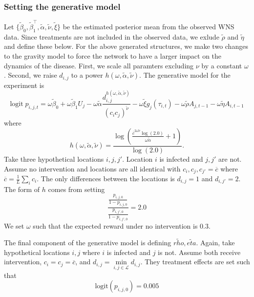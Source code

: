 \documentclass[11pt]{article}
\newcommand{\logit}{\text{logit}}
\newcommand{\T}{\intercal}
\begin{document}
\subsubsection{Setting the generative model}
\label{sec-4-1-1}

Let $\lbrace \widetilde{\beta}_0, \widetilde{\beta}_1^\T,
    \widetilde{\alpha}, \widetilde{\nu}, \widetilde{\xi} \rbrace$ be
the estimated posterior mean from the observed WNS data.  Since
treatments are not included in the observed data, we exlude
$\widetilde{\rho}$ and $\widetilde{\eta}$ and define these below.
For the above generated structures, we make two changes to the
gravity model to force the network to have a larger impact on the
dynamics of the disease.  First, we scale all paramters excluding
$\nu$ by a constant $\omega$.  Second, we raise $d_{i,j}$ to a
power $h(\omega,\widetilde{\alpha},\widetilde{\nu})$.  The
generative model for the experiment is
\begin{equation*}
  \logit \; p_{i,j,t} = \omega\widetilde{\beta}_0 + \omega\widetilde{\beta}_1 U_j 
  - \omega\widetilde{\alpha}
  \frac{d_{i,j}^{h(\omega,\widetilde{\alpha},\widetilde{\nu})}}{(c_ic_j)^{\widetilde{\nu}}}
  - 
  \omega\widetilde{\xi} g_j(\tau_{i,t})
  - \omega\widetilde{\rho} A_{j,t-1} - \omega\widetilde{\eta} A_{i,t-1}
\end{equation*}
where 
\begin{equation*}
  h(\omega,\widetilde{\alpha},\widetilde{\nu}) =
  \frac{\log\left(\frac{\overline{c}^{2\omega\widetilde{\nu}}\log(2.0)}
      {\omega\widetilde{\alpha}}
      + 1 \right)}{\log(2.0)}.
\end{equation*}
Take three hypothetical locations $i,j,j'$.  Location $i$ is
infected and $j,j'$ are not.  Assume no intervention and locations
are all identical with $c_i,c_j,c_{j'} = \overline{c}$ where
$\overline{c} = \frac{1}{L}\sum_i c_i$.  The only differences
between the locations is $d_{i,j} = 1$ and $d_{i,j'} = 2$.  The
form of $h$ comes from setting
\begin{equation*}
  \frac{\frac{p_{i,j,0}}{1-p_{i,j,0}}}{\frac{p_{i,j',0}}{1-p_{i,j',0}}}
  = 2.0
\end{equation*}
We set $\omega$ such that the expected reward under no
intervention is $0.3$.

The final component of the generative model is defining
$\widetilde{rho},\widetilde{eta}$.  Again, take hypothetical
locations $i,j$ where $i$ is infected and $j$ is not.  Assume both
receive intervention, $c_i = c_j = \overline{c}$, and $d_{i,j} =
    \underset{i,j\in\mathcal{L}} \min d_{i,j}$.  They treatment
effects are set such that
\begin{equation*}
  \logit(p_{i,j,0}) = 0.005
\end{equation*}
\end{document}
